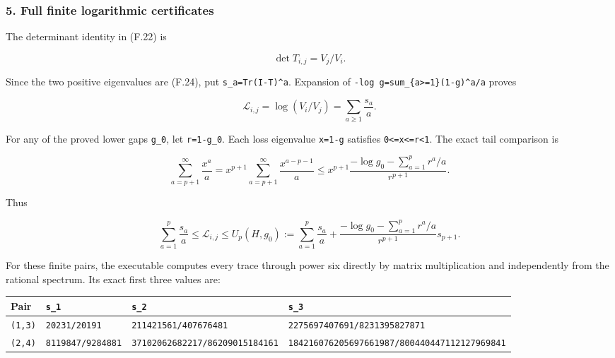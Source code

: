\subsubsection{5. Full finite logarithmic certificates}\label{endpoint-restriction_fixture--full-finite-logarithmic-certificates}

The determinant identity in (F.22) is

\[
\det T_{i,j}=V_j/V_i.
\]

Since the two positive eigenvalues are (F.24), put \texttt{s\_a=Tr(I-T)\^{}a}. Expansion of \texttt{-log\ g=sum\_\{a\textgreater{}=1\}(1-g)\^{}a/a} proves

\[
\mathcal L_{i,j}=\log(V_i/V_j)=\sum_{a\ge1}\frac{s_a}{a}.
\tag{F.31}
\]

For any of the proved lower gaps \nolinkurl{g_0}, let \nolinkurl{r=1-g_0}. Each loss eigenvalue \nolinkurl{x=1-g} satisfies \texttt{0\textless{}=x\textless{}=r\textless{}1}. The exact tail comparison is

\[
\sum_{a=p+1}^\infty\frac{x^a}{a}
=x^{p+1}\sum_{a=p+1}^\infty\frac{x^{a-p-1}}a
\le x^{p+1}\frac{-\log g_0-\sum_{a=1}^p r^a/a}{r^{p+1}}.
\]

Thus

\[
\sum_{a=1}^p\frac{s_a}{a}\le\mathcal L_{i,j}
\le U_p(H,g_0):=\sum_{a=1}^p\frac{s_a}{a}
+\frac{-\log g_0-\sum_{a=1}^p r^a/a}{r^{p+1}}s_{p+1}.
\tag{F.32}
\]

For these finite pairs, the executable computes every trace through power six directly by matrix multiplication and independently from the rational spectrum. Its exact first three values are:

{\def\LTcaptype{none} %
\begin{longtable}[]{@{}
  >{\raggedright\arraybackslash}p{}
  >{\raggedleft\arraybackslash}p{}
  >{\raggedleft\arraybackslash}p{}
  >{\raggedleft\arraybackslash}p{}@{}}
\toprule\noalign{}
\begin{minipage}[b]{\linewidth}\raggedright
Pair
\end{minipage} & \begin{minipage}[b]{\linewidth}\raggedleft
\nolinkurl{s_1}
\end{minipage} & \begin{minipage}[b]{\linewidth}\raggedleft
\nolinkurl{s_2}
\end{minipage} & \begin{minipage}[b]{\linewidth}\raggedleft
\nolinkurl{s_3}
\end{minipage} \\
\midrule\noalign{}
\endhead
\bottomrule\noalign{}
\endlastfoot
\nolinkurl{(1,3)} & \nolinkurl{20231/20191} & \nolinkurl{211421561/407676481} & \nolinkurl{2275697407691/8231395827871} \\
\nolinkurl{(2,4)} & \nolinkurl{8119847/9284881} & \nolinkurl{37102062682217/86209015184161} & \nolinkurl{184216076205697661987/800440447112127969841} \\
\end{longtable}
}

